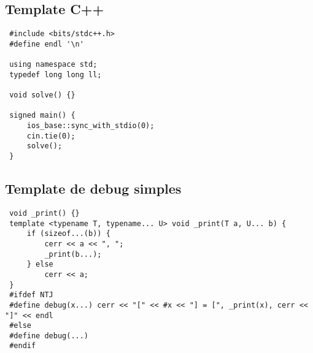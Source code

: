 \documentclass[11pt, a4paper, twoside]{article}
\begin{document}
\subsection{Template C++}
\begin{lstlisting}
 #include <bits/stdc++.h>
 #define endl '\n'
 
 using namespace std;
 typedef long long ll;
 
 void solve() {}
 
 signed main() {
     ios_base::sync_with_stdio(0);
     cin.tie(0);
     solve();
 }
\end{lstlisting}

\subsection{Template de debug simples}
\begin{lstlisting}
 void _print() {}
 template <typename T, typename... U> void _print(T a, U... b) {
     if (sizeof...(b)) {
         cerr << a << ", ";
         _print(b...);
     } else
         cerr << a;
 }
 #ifdef NTJ
 #define debug(x...) cerr << "[" << #x << "] = [", _print(x), cerr << "]" << endl
 #else
 #define debug(...)
 #endif
\end{lstlisting}
\end{document}
